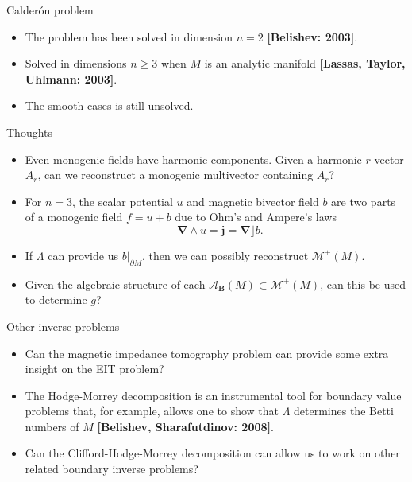 \documentclass[aspectratio=169]{beamer}
\newcommand\boldgold[1]{\textcolor{csu_gold}{\textbf{#1}}}
\newcommand{\algebra}{\mathcal{A}}
\newcommand{\grad}{\boldsymbol{\nabla}}
\newcommand{\monogenics}{\mathcal{M}}
\newcommand{\blade}[1]{\boldsymbol{#1}}
\newcommand{\boundary}{{\partial M}}
\newcommand{\bivector}{\blade{B}}
\begin{document}
\begin{frame}{Calder\'on problem}
\vfill
\begin{itemize}
\pause
    \item The problem has been solved in dimension $n=2$ \boldgold{[Belishev: 2003]}.
\pause
    \item Solved in dimensions $n\geq 3$ when $M$ is an analytic manifold \boldgold{[Lassas, Taylor, Uhlmann: 2003]}. 
\pause
\item The smooth cases is still unsolved.
\end{itemize}
\vfill
\end{frame}

\begin{frame}{Thoughts}
\vfill
\begin{itemize}
\pause
\item Even monogenic fields have harmonic components. Given a harmonic $r$-vector $A_{r}$, can we reconstruct a monogenic multivector containing $A_r$?
\pause
\item For $n=3$, the scalar potential $u$ and magnetic bivector field $b$ are two parts of a monogenic field $f=u+b$ due to Ohm's and Ampere's laws 
\[
-\grad \wedge u = \blade{j}= \grad \rfloor b.
\] 
\vspace*{-0.25cm}
\pause
\item If $\Lambda$ can provide us $b\vert_\boundary$, then we can possibly reconstruct $\monogenics^+(M)$.
\pause
\item Given the algebraic structure of each $\algebra_{\bivector}(M) \subset \monogenics^+(M)$, can this be used to determine $g$?
\end{itemize}
\vfill
\end{frame}

\begin{frame}{Other inverse problems}
\vfill
\begin{itemize}
\pause
    \item Can the magnetic impedance tomography problem can provide some extra insight on the EIT problem?
\pause
    \item The Hodge-Morrey decomposition is an instrumental tool for boundary value problems that, for example, allows one to show that
 $\Lambda$ determines the Betti numbers of $M$ \boldgold{[Belishev, Sharafutdinov: 2008]}.
\pause
    \item Can the Clifford-Hodge-Morrey decomposition can allow us to work on other related boundary inverse problems? 
\end{itemize}
\vfill
\end{frame}
\end{document}
